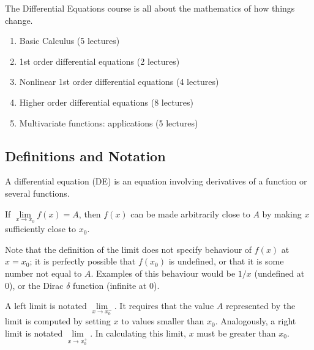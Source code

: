 
The Differential Equations course is all about the mathematics of how things change.

\begin{enumerate}
	\item Basic Calculus (5 lectures)
	\item 1st order differential equations (2 lectures)
	\item Nonlinear 1st order differential equations (4 lectures)
	\item Higher order differential equations (8 lectures)
	\item Multivariate functions: applications (5 lectures)
\end{enumerate}

\subsection{Definitions and Notation}
\begin{definition}
	A differential equation (DE) is an equation involving derivatives of a function or several functions.
\end{definition}
\begin{definition}
	If \(\lim\limits_{x \to x_0} f(x) = A\), then \(f(x)\) can be made arbitrarily close to \(A\) by making \(x\) sufficiently close to \(x_0\).
\end{definition}
Note that the definition of the limit does not specify behaviour of \(f(x)\) at \(x=x_0\); it is perfectly possible that \(f(x_0)\) is undefined, or that it is some number not equal to \(A\).
Examples of this behaviour would be \(1/x\) (undefined at 0), or the Dirac \(\delta\) function (infinite at 0).

\begin{definition}
	A left limit is notated \(\lim\limits_{x \to x_0^-}\).
	It requires that the value \(A\) represented by the limit is computed by setting \(x\) to values smaller than \(x_0\).
	Analogously, a right limit is notated \(\lim\limits_{x \to x_0^+}\).
	In calculating this limit, \(x\) must be greater than \(x_0\).
\end{definition}

